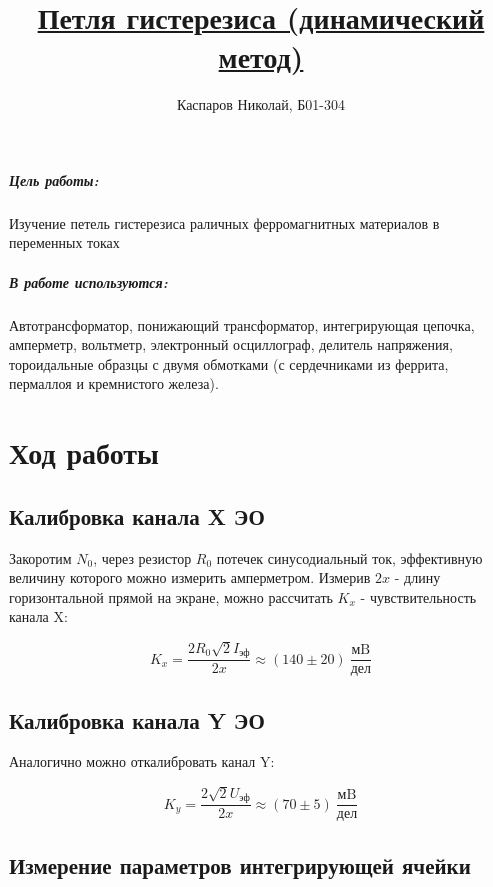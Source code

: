 \documentclass[a4paper]{article}
\title{\underline{Петля гистерезиса (динамический метод)}}
\author{Каспаров Николай, Б01-304}
\begin{document}
\maketitle
\begin{center}
\Large{\textbf{ }}
\end{center}

\subparagraph{Цель работы:}

    Изучение петель гистерезиса раличных ферромагнитных
    материалов в переменных токах

\subparagraph{В работе используются:}

    Автотрансформатор, понижающий
    трансформатор, интегрирующая цепочка, амперметр, вольтметр,
    электронный осциллограф, делитель напряжения, тороидальные образцы
    с двумя обмотками (с сердечниками из феррита, пермаллоя и кремнистого
    железа).

\section{Ход работы}

\subsection{Калибровка канала X ЭО}

Закоротим $N_0$, через резистор $R_0$ потечек синусодиальный ток, эффективную величину которого
можно измерить амперметром. Измерив $2x$ - длину горизонтальной прямой на экране, 
можно рассчитать $K_x$ - чувствительность канала X:

\begin{equation}
    K_x = \frac{2R_0 \sqrt{2}I_\text{эф}}{2x} \approx (140 \pm 20) \ \frac{\text{мB}}{\text{дел}}
\end{equation}

\subsection{Калибровка канала Y ЭО}

Аналогично можно откалибровать канал Y:

\begin{equation}
    K_y = \frac{2 \sqrt{2}U_\text{эф}}{2x} \approx (70 \pm 5) \ \frac{\text{мB}}{\text{дел}}
\end{equation}

\subsection{Измерение параметров интегрирующей ячейки}
\end{document}
